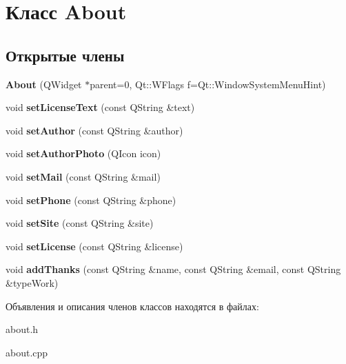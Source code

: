 \hypertarget{class_about}{\section{Класс \-About}
\label{class_about}
}
\subsection*{Открытые члены}
\begin{DoxyCompactItemize}
\item 
\hypertarget{class_about_a3c6fd8fbc97d4cf92ab04f3335ddb455}{{\bfseries \-About} (\-Q\-Widget $\ast$parent=0, \-Qt\-::\-W\-Flags f=\-Qt\-::\-Window\-System\-Menu\-Hint)}\label{class_about_a3c6fd8fbc97d4cf92ab04f3335ddb455}

\item 
\hypertarget{class_about_ad8584093c570bf210e1263f8846d0d28}{void {\bfseries set\-License\-Text} (const \-Q\-String \&text)}\label{class_about_ad8584093c570bf210e1263f8846d0d28}

\item 
\hypertarget{class_about_aba3d758b7696587d4f89c82541c99648}{void {\bfseries set\-Author} (const \-Q\-String \&author)}\label{class_about_aba3d758b7696587d4f89c82541c99648}

\item 
\hypertarget{class_about_aa1212f1784d285c68f4c928dbb28f4d6}{void {\bfseries set\-Author\-Photo} (\-Q\-Icon icon)}\label{class_about_aa1212f1784d285c68f4c928dbb28f4d6}

\item 
\hypertarget{class_about_a1ba170f3e62deaef4458c2170cb5a186}{void {\bfseries set\-Mail} (const \-Q\-String \&mail)}\label{class_about_a1ba170f3e62deaef4458c2170cb5a186}

\item 
\hypertarget{class_about_ac55c582b7f1d5eb383fe30c1ce5ca583}{void {\bfseries set\-Phone} (const \-Q\-String \&phone)}\label{class_about_ac55c582b7f1d5eb383fe30c1ce5ca583}

\item 
\hypertarget{class_about_accd8e81c5bcf263e9529da44cc7c8c72}{void {\bfseries set\-Site} (const \-Q\-String \&site)}\label{class_about_accd8e81c5bcf263e9529da44cc7c8c72}

\item 
\hypertarget{class_about_ac49bccbf3e886ad2f30b8681ad5f387c}{void {\bfseries set\-License} (const \-Q\-String \&license)}\label{class_about_ac49bccbf3e886ad2f30b8681ad5f387c}

\item 
\hypertarget{class_about_abc0ed9bdad9e1acb44537a218850769e}{void {\bfseries add\-Thanks} (const \-Q\-String \&name, const \-Q\-String \&email, const \-Q\-String \&type\-Work)}\label{class_about_abc0ed9bdad9e1acb44537a218850769e}

\end{DoxyCompactItemize}


Объявления и описания членов классов находятся в файлах\-:\begin{DoxyCompactItemize}
\item 
about.\-h\item 
about.\-cpp\end{DoxyCompactItemize}
